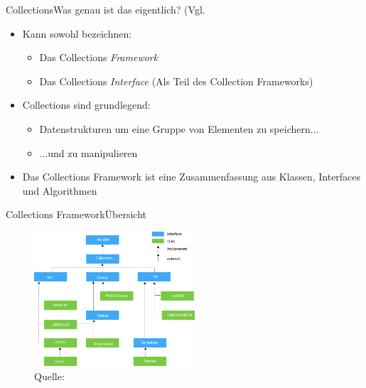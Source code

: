 \begin{frame}{Collections}{Was genau ist das eigentlich? (Vgl. \cite{collection1}}
    \begin{itemize}[<+->]
        \item Kann sowohl bezeichnen:
        \begin{itemize}
            \item Das Collections \textit{Framework}
            \item Das Collections \textit{Interface} (Als Teil des Collection Frameworks)
        \end{itemize}
        \item Collections sind grundlegend:
        \begin{itemize}
            \item Datenstrukturen um eine Gruppe von Elementen zu speichern...
            \item ...und zu manipulieren
        \end{itemize}
        \item Das Collections Framework ist eine Zusammenfassung aus Klassen, Interfaces und Algorithmen
    \end{itemize}
\end{frame}

\begin{frame}{Collections Framework}{Übersicht}
    \begin{figure}
    \centering
    \includegraphics[height=5cm]{graph/java-collection-hierarchy}
    \caption*{Quelle: \cite{collection1}}
    \end{figure}
\end{frame}

